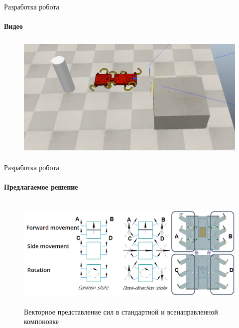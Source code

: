\documentclass[aspectratio=169,xcolor=table]{beamer}
\begin{document}
\begin{frame}[t]{Разработка робота}
    \framesubtitle{Видео}
    \vspace{-0.6cm}
    \begin{figure}[H]
        \href{https://youtu.be/EQ6oGZVDpoc}{
            \centering\includegraphics[height=6cm,width=1\textwidth,keepaspectratio]{sidestep_segment_video_preview.png}}
    \end{figure}
\end{frame}

\begin{frame}[t]{Разработка робота}
    \framesubtitle{Предлагаемое решение}
    \vspace{-0.8cm}
    \begin{figure}[H]
        \centering\includegraphics[height=5.5cm,width=1\textwidth,keepaspectratio]{omni_rot.png}
        \caption*{Векторное представление сил в стандартной и всенаправленной компоновке}
    \end{figure}
\end{frame}
\end{document}
